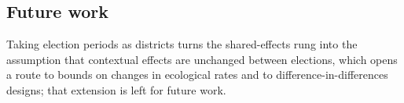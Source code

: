 \subsection{Future work}

Taking election periods as districts turns the shared-effects rung into the
assumption that contextual effects are unchanged between elections, which opens a
route to bounds on changes in ecological rates and to difference-in-differences
designs; that extension is left for future work.
